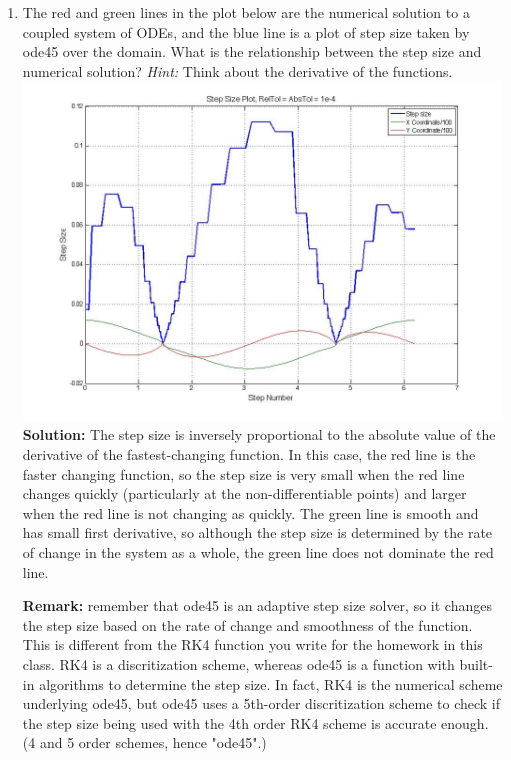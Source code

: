 \documentclass[letterpaper, fontsize=11pt]{scrartcl}
\numberwithin{equation}{section} %
\numberwithin{figure}{section} %
\numberwithin{table}{section} %
\begin{document}
\begin{enumerate}
and the function call is:
\begin{lstlisting}
[T Y] = ode45(@(t,y) yp(t,y,a), [0 10], [1 1]);
\end{lstlisting}
\item The red and green lines in the plot below are the numerical solution to a coupled system of ODEs, and the blue line is a plot of step size taken by ode45 over the domain. What is the relationship between the step size and numerical solution? \textit{Hint:} Think about the derivative of the functions. \newline
\includegraphics[width=\textwidth]{section5_1.jpg}
\textbf{Solution:} The step size is inversely proportional to the absolute value of the derivative of the fastest-changing function. In this case, the red line is the faster changing function, so the step size is very small when the red line changes quickly (particularly at the non-differentiable points) and larger when the red line is not changing as quickly. The green line is smooth and has small first derivative, so although the step size is determined by the rate of change in the system as a whole, the green line does not dominate the red line. \par
\textbf{Remark:} remember that ode45 is an adaptive step size solver, so it changes the step size based on the rate of change and smoothness of the function. This is different from the RK4 function you write for the homework in this class. RK4 is a discritization scheme, whereas ode45 is a function with built-in algorithms to determine the step size. In fact, RK4 is the numerical scheme underlying ode45, but ode45 uses a 5th-order discritization scheme to check if the step size being used with the 4th order RK4 scheme is accurate enough. (4 and 5 order schemes, hence "ode45".)

\end{enumerate}

\end{document}
